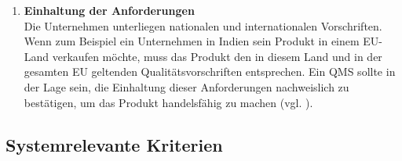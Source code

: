 \documentclass[11pt]{scrartcl}       %
\begin{document}
\begin{enumerate}
\item[] \textbf{Einhaltung der Anforderungen} \\
Die Unternehmen unterliegen nationalen und internationalen Vorschriften. Wenn zum Beispiel ein Unternehmen in Indien sein Produkt in einem EU-Land verkaufen möchte, muss das Produkt den in diesem Land und in der gesamten EU geltenden Qualitätsvorschriften entsprechen. Ein QMS sollte in der Lage sein, die Einhaltung dieser Anforderungen nachweislich zu bestätigen, um das Produkt handelsfähig zu machen (vgl. \cite{alexandrova2020Information}).

\end{enumerate}

\subsection{Systemrelevante Kriterien}
\end{document}
